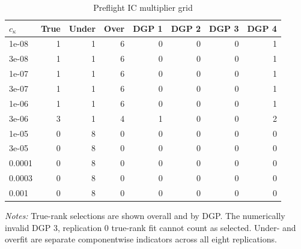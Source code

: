 \begin{table}[!htbp]
\centering
\caption{Preflight IC multiplier grid}
\label{tab:ic-grid}
\begin{tabular}{lrrrrrrr}
\toprule
$c_\kappa$ & True & Under & Over & DGP 1 & DGP 2 & DGP 3 & DGP 4 \\
\midrule
1e-08 & 1 & 1 & 6 & 0 & 0 & 0 & 1 \\
3e-08 & 1 & 1 & 6 & 0 & 0 & 0 & 1 \\
1e-07 & 1 & 1 & 6 & 0 & 0 & 0 & 1 \\
3e-07 & 1 & 1 & 6 & 0 & 0 & 0 & 1 \\
1e-06 & 1 & 1 & 6 & 0 & 0 & 0 & 1 \\
3e-06 & 3 & 1 & 4 & 1 & 0 & 0 & 2 \\
1e-05 & 0 & 8 & 0 & 0 & 0 & 0 & 0 \\
3e-05 & 0 & 8 & 0 & 0 & 0 & 0 & 0 \\
0.0001 & 0 & 8 & 0 & 0 & 0 & 0 & 0 \\
0.0003 & 0 & 8 & 0 & 0 & 0 & 0 & 0 \\
0.001 & 0 & 8 & 0 & 0 & 0 & 0 & 0 \\
\bottomrule
\end{tabular}
\begin{minipage}{0.96\linewidth}\footnotesize \textit{Notes:} True-rank selections are shown overall and by DGP. The numerically invalid DGP 3, replication 0 true-rank fit cannot count as selected. Under- and overfit are separate componentwise indicators across all eight replications.\end{minipage}
\end{table}
